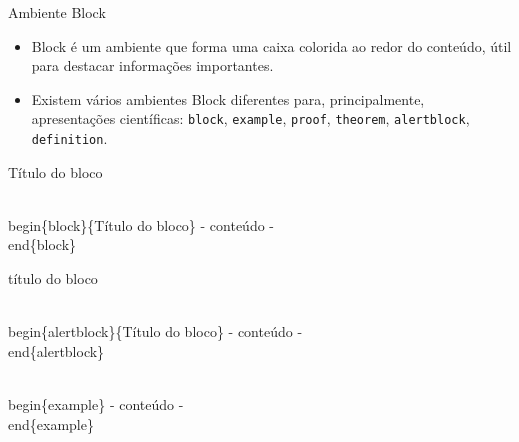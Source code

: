 \begin{frame}{Ambiente Block}
    \begin{itemize}
    \item Block é um ambiente que forma uma caixa colorida ao redor do conteúdo, útil para destacar informações importantes.
    \item Existem vários ambientes Block diferentes para, principalmente, apresentações científicas: \verb|block|, \verb|example|, \verb|proof|, \verb|theorem|, \verb|alertblock|, \verb|definition|.
    \end{itemize}

\newpage

    \begin{block}{Título do bloco}
\begin{semiverbatim}
\\begin\{block\}\{Título do bloco\}
  - conteúdo -
\\end\{block\}
\end{semiverbatim}
    \end{block}
   
   \begin{alertblock}{título do bloco}
\begin{semiverbatim}
\\begin\{alertblock\}\{Título do bloco\}
  - conteúdo -
\\end\{alertblock\}
\end{semiverbatim}
    \end{alertblock}

    \begin{example}
\begin{semiverbatim}
\\begin\{example\}
  - conteúdo -
\\end\{example\}
\end{semiverbatim}
    \end{example}

\end{frame}

